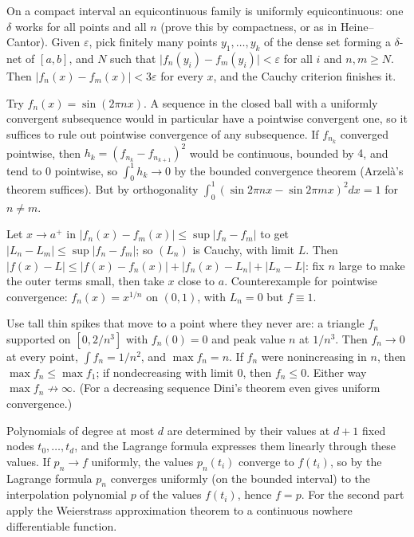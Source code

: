 \documentclass[11pt,a4paper]{article}
\begin{document}
On a compact interval an equicontinuous family is uniformly equicontinuous: one \(\delta\) works for all points and all \(n\) (prove this by compactness, or as in Heine--Cantor).
Given \(\varepsilon\), pick finitely many points \(y_1,\dots,y_k\) of the dense set forming a \(\delta\)-net of \([a,b]\), and \(N\) such that \(\lvert f_n(y_i)-f_m(y_i)\rvert\lt\varepsilon\) for all \(i\) and \(n,m\ge N\). Then \(\lvert f_n(x)-f_m(x)\rvert\lt3\varepsilon\) for every \(x\), and the Cauchy criterion finishes it.

Try \(f_n(x)=\sin(2\pi nx)\). A sequence in the closed ball with a uniformly convergent subsequence would in particular have a pointwise convergent one, so it suffices to rule out pointwise convergence of any subsequence.
If \(f_{n_k}\) converged pointwise, then \(h_k=(f_{n_k}-f_{n_{k+1}})^2\) would be continuous, bounded by \(4\), and tend to \(0\) pointwise, so \(\int_0^1h_k\to0\) by the bounded convergence theorem (Arzelà's theorem suffices). But by orthogonality \(\int_0^1(\sin 2\pi nx-\sin 2\pi mx)^2dx=1\) for \(n\ne m\).

Let \(x\to a^+\) in \(\lvert f_n(x)-f_m(x)\rvert\le\sup\lvert f_n-f_m\rvert\) to get \(\lvert L_n-L_m\rvert\le\sup\lvert f_n-f_m\rvert\); so \((L_n)\) is Cauchy, with limit \(L\).
Then \(\lvert f(x)-L\rvert\le\lvert f(x)-f_n(x)\rvert+\lvert f_n(x)-L_n\rvert+\lvert L_n-L\rvert\): fix \(n\) large to make the outer terms small, then take \(x\) close to \(a\). Counterexample for pointwise convergence: \(f_n(x)=x^{1/n}\) on \((0,1)\), with \(L_n=0\) but \(f\equiv1\).

Use tall thin spikes that move to a point where they never are: a triangle \(f_n\) supported on \([0,2/n^3]\) with \(f_n(0)=0\) and peak value \(n\) at \(1/n^3\). Then \(f_n\to0\) at every point, \(\int f_n=1/n^2\), and \(\max f_n=n\).
If \(f_n\) were nonincreasing in \(n\), then \(\max f_n\le\max f_1\); if nondecreasing with limit \(0\), then \(f_n\le0\). Either way \(\max f_n\not\to\infty\). (For a decreasing sequence Dini's theorem even gives uniform convergence.)

Polynomials of degree at most \(d\) are determined by their values at \(d+1\) fixed nodes \(t_0,\dots,t_d\), and the Lagrange formula expresses them linearly through these values.
If \(p_n\to f\) uniformly, the values \(p_n(t_i)\) converge to \(f(t_i)\), so by the Lagrange formula \(p_n\) converges uniformly (on the bounded interval) to the interpolation polynomial \(p\) of the values \(f(t_i)\), hence \(f=p\). For the second part apply the Weierstrass approximation theorem to a continuous nowhere differentiable function.
\end{document}
